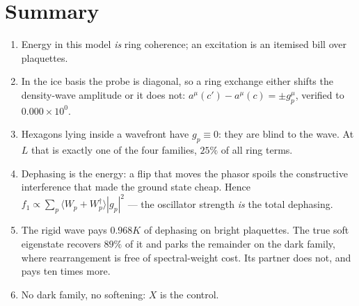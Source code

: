 \documentclass[11pt]{article}
\newcommand{\Wp}{W_p}
\newcommand{\Wpd}{W_p^{\dagger}}
\begin{document}
\section{Summary}

\begin{enumerate}\setlength{\itemsep}{2pt}
\item Energy in this model \emph{is} ring coherence; an excitation is an
itemised bill over plaquettes.
\item In the ice basis the probe is diagonal, so a ring exchange either
shifts the density-wave amplitude or it does not:
$a^\mu(c')-a^\mu(c)=\pm g^\mu_p$, verified to $0.000\times10^{0}$.
\item Hexagons lying inside a wavefront have $g_p\equiv0$: they are
blind to the wave. At $L$ that is exactly one of the four families,
$25\%$ of all ring terms.
\item Dephasing is the energy: a flip that moves the phasor spoils the
constructive interference that made the ground state cheap. Hence
$f_1\propto\sum_p\langle \Wp+\Wpd\rangle|g_p|^2$ --- the oscillator
strength \emph{is} the total dephasing.
\item The rigid wave pays $0.968K$ of dephasing on bright plaquettes.
The true soft eigenstate recovers $89\%$ of it and parks the remainder
on the dark family, where rearrangement is free of spectral-weight cost.
Its partner does not, and pays ten times more.
\item No dark family, no softening: $X$ is the control.
\end{enumerate}
\end{document}
